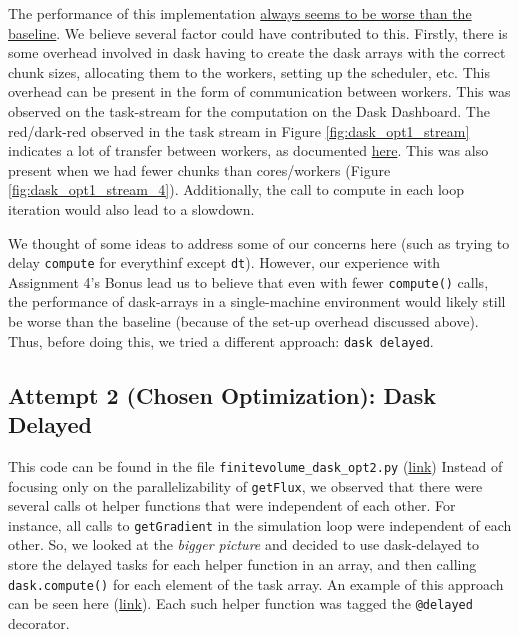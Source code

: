 \documentclass[a4paper,10pt]{article}
\begin{document}
The performance of this implementation \underline{always seems to be worse than the baseline}. We believe several factor could have contributed to this. Firstly, there is some overhead involved in dask having to create the dask arrays with the correct chunk sizes, allocating them to the workers, setting up the scheduler, etc. This overhead can be present in the form of communication between workers. This was observed on the task-stream for the computation on the Dask Dashboard. The red/dark-red observed in the task stream in Figure \ref{fig:dask_opt1_stream} indicates a lot of transfer between workers, as documented \href{https://docs.dask.org/en/stable/dashboard.html#task-stream}{here}. This was also present when we had fewer chunks than cores/workers (Figure \ref{fig:dask_opt1_stream_4}). Additionally, the call to compute in each loop iteration would also lead to a slowdown. 

We thought of some ideas to address some of our concerns here (such as trying to delay \verb|compute| for everythinf except \verb|dt|). However, our experience with Assignment 4's Bonus lead us to believe that even with fewer \verb|compute()| calls, the performance of dask-arrays in a single-machine environment would likely still be worse than the baseline (because of the set-up overhead discussed above). Thus, before doing this, we tried a different approach: \verb|dask delayed|. 

\subsection{Attempt 2 (Chosen Optimization): Dask Delayed}
This code can be found in the file \verb|finitevolume_dask_opt2.py| (\href{https://github.com/paulmyr/DD2358-HPC25/blob/master/10_project_rishi_paul/code/dask/finitevolume_dask_opt1.py}{link}) Instead of focusing only on the parallelizability of \verb|getFlux|, we observed that there were several calls ot helper functions that were independent of each other. For instance, all calls to \verb|getGradient| in the simulation loop were independent of each other. So, we looked at the \textit{bigger picture} and decided to use dask-delayed to store the delayed tasks for each helper function in an array, and then calling \verb|dask.compute()| for each element of the task array. An example of this approach can be seen here (\href{https://github.com/paulmyr/DD2358-HPC25/blob/master/10_project_rishi_paul/code/dask/finitevolume_dask_opt2.py#L273}{link}). Each such helper function was tagged the \verb|@delayed| decorator. 
\end{document}
